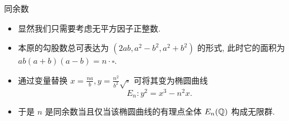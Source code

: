 \documentclass[aspectratio=169,handout]{ctexbeamer}
\begin{document}
\begin{frame}{同余数}
  \begin{itemize}
    \item 显然我们只需要考虑无平方因子正整数.
    \item 本原的勾股数总可表达为 $(2ab,a^2-b^2,a^2+b^2)$ 的形式, 此时它的面积为 $ab(a+b)(a-b)=n\cdot\square$.
    \item 通过变量替换 $x=\frac{na}b,y=\frac{n^2}{b^2}\sqrt{\square}$ 可将其变为椭圆曲线
    \[
      E_n:y^2=x^3-n^2x.
    \]
    \item 于是 $n$ 是同余数当且仅当该椭圆曲线的有理点全体 $E_n({\mathbb{Q}})$ 构成无限群.
  \end{itemize}
\end{frame}


\end{document}
